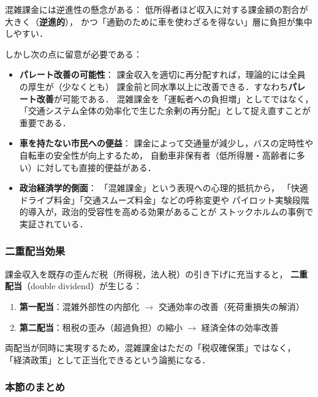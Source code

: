 混雑課金には逆進性の懸念がある：
低所得者ほど収入に対する課金額の割合が大きく（\textbf{逆進的}），
かつ「通勤のために車を使わざるを得ない」層に負担が集中しやすい\cite{Pigou1920}．

しかし次の点に留意が必要である：

\begin{itemize}
  \item
    \textbf{パレート改善の可能性}：
    課金収入を適切に再分配すれば，理論的には全員の厚生が（少なくとも）
    課金前と同水準以上に改善できる．すなわち\textbf{パレート改善}が可能である．
    混雑課金を「運転者への負担増」としてではなく，
    「交通システム全体の効率化で生じた余剰の再分配」として捉え直すことが重要である．

  \item
    \textbf{車を持たない市民への便益}：
    課金によって交通量が減少し，バスの定時性や自転車の安全性が向上するため，
    自動車非保有者（低所得層・高齢者に多い）に対しても直接的便益がある．

  \item
    \textbf{政治経済学的側面}：
    「混雑課金」という表現への心理的抵抗から，
    「快適ドライブ料金」「交通スムーズ料金」などの呼称変更や
    パイロット実験段階的導入が，政治的受容性を高める効果があることが
    ストックホルムの事例で実証されている\cite{Vickrey1969}．
\end{itemize}

\subsubsection*{二重配当効果}

課金収入を既存の歪んだ税（所得税，法人税）の引き下げに充当すると，
\textbf{二重配当}（double dividend）が生じる\cite{Pigou1920}：

\begin{enumerate}
  \item \textbf{第一配当}：混雑外部性の内部化 $\rightarrow$ 交通効率の改善（死荷重損失の解消）
  \item \textbf{第二配当}：租税の歪み（超過負担）の縮小 $\rightarrow$ 経済全体の効率改善
\end{enumerate}

両配当が同時に実現するため，混雑課金はただの「税収確保策」ではなく，
「経済政策」として正当化できるという論拠になる．

\subsubsection*{本節のまとめ}

